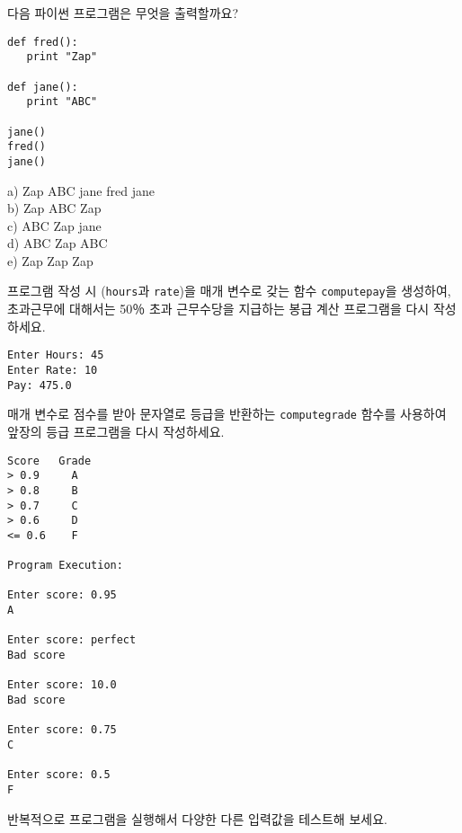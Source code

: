 \begin{ex}

다음 파이썬 프로그램은 무엇을 출력할까요?

\beforeverb
\begin{verbatim}
def fred():
   print "Zap"

def jane():
   print "ABC"

jane()
fred()
jane()
\end{verbatim}
\afterverb
%
a) Zap ABC jane fred jane\\
b) Zap ABC Zap\\
c) ABC Zap jane\\
d) ABC Zap ABC\\
e) Zap Zap Zap
\end{ex}

\begin{ex}

프로그램 작성 시 ({\tt hours}과 {\tt rate})을 매개 변수로 갖는 함수 {\tt computepay}을 생성하여,
초과근무에 대해서는 50％ 초과 근무수당을 지급하는 봉급 계산 프로그램을 다시 작성하세요.

\begin{verbatim}
Enter Hours: 45
Enter Rate: 10
Pay: 475.0
\end{verbatim}
\end{ex}

\begin{ex}

매개 변수로 점수를 받아 문자열로 등급을 반환하는 {\tt computegrade} 함수를 사용하여
앞장의 등급 프로그램을 다시 작성하세요.

\begin{verbatim}
Score   Grade
> 0.9     A
> 0.8     B
> 0.7     C
> 0.6     D
<= 0.6    F

Program Execution:

Enter score: 0.95
A

Enter score: perfect
Bad score

Enter score: 10.0
Bad score

Enter score: 0.75
C

Enter score: 0.5
F
\end{verbatim}

반복적으로 프로그램을 실행해서 다양한 다른 입력값을 테스트해 보세요.

\end{ex}


